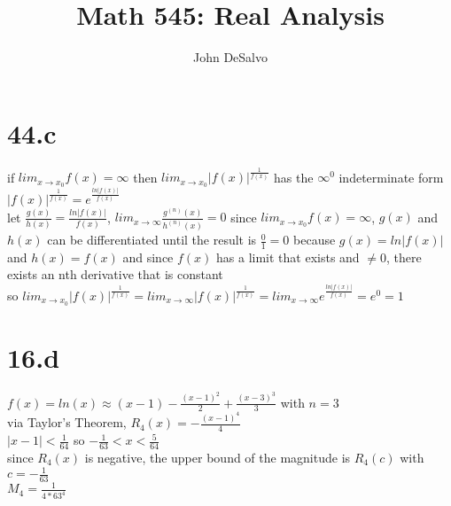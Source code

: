 \documentclass[12pt]{article}
\begin{document}
\pagestyle{plain}

\title{Math 545: Real Analysis}
\author{John DeSalvo}
\maketitle

\section{44.c}
if $lim_{x \to x_{0}}f(x) = \infty$ then $lim_{x \to x_{0}}|f(x)|^{\frac{1}{f(x)}}$ has the $\infty ^{0}$ indeterminate form \\
$|f(x)|^{\frac{1}{f(x)}} = e^{\frac{ln|f(x)|}{f(x)}}$ \\
let $\frac{g(x)}{h(x)} = \frac{ln|f(x)|}{f(x)}$, $lim_{x \to \infty}\frac{g^{(n)}(x)}{h^{(n)}(x)} = 0$ since $lim_{x \to x_{0}}f(x) = \infty$, $g(x)$ and $h(x)$ can be differentiated until the result is $\frac{0}{1} = 0$ because $g(x) = ln|f(x)|$ and $h(x) = f(x)$ and since $f(x)$ has a limit that exists and $\ne 0$, there exists an nth derivative that is constant \\
so $lim_{x \to x_{0}}|f(x)|^{\frac{1}{f(x)}} = lim_{x \to \infty}|f(x)|^{\frac{1}{f(x)}} = lim_{x \to \infty}e^{\frac{ln|f(x)|}{f(x)}} = e^{0} = 1$

\section{16.d}
$f(x) = ln(x) \approx (x-1) - \frac{(x-1)^{2}}{2} + \frac{(x-3)^{3}}{3}$ with $n=3$ \\
via Taylor's Theorem, $R_{4}(x) = -\frac{(x-1)^{4}}{4}$ \\
$|x-1| < \frac{1}{64}$ so $ -\frac{1}{63} < x < \frac{5}{64}$ \\
since $R_{4}(x)$ is negative, the upper bound of the magnitude is $R_{4}(c)$ with $c = -\frac{1}{63}$ \\
$M_{4} = \frac{1}{4*63^{4}}$
\end{document}
